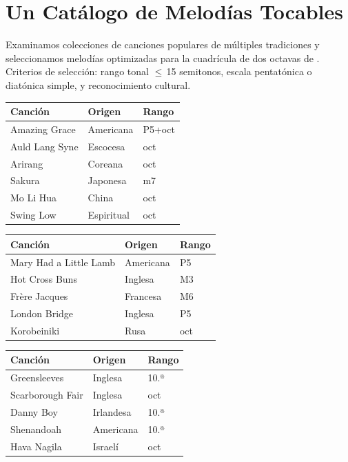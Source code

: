 \documentclass[11pt]{article}
\begin{document}
\section{Un Catálogo de Melodías Tocables}

Examinamos colecciones de canciones populares de múltiples tradiciones y seleccionamos melodías optimizadas para la cuadrícula de dos octavas de \np{}. Criterios de selección: rango tonal $\leq$\,15 semitonos, escala pentatónica o diatónica simple, y reconocimiento cultural.

\begin{card}
\begin{tabularx}{\linewidth}{Xll}
\toprule
\textbf{Canción} & \textbf{Origen} & \textbf{Rango} \\
\midrule
Amazing Grace & Americana & P5+oct \\
Auld Lang Syne & Escocesa & oct \\
Arirang & Coreana & oct \\
Sakura & Japonesa & m7 \\
Mo Li Hua & China & oct \\
Swing Low & Espiritual & oct \\
\bottomrule
\end{tabularx}
\end{card}

\begin{card}
\begin{tabularx}{\linewidth}{Xll}
\toprule
\textbf{Canción} & \textbf{Origen} & \textbf{Rango} \\
\midrule
Mary Had a Little Lamb & Americana & P5 \\
Hot Cross Buns & Inglesa & M3 \\
Fr\`ere Jacques & Francesa & M6 \\
London Bridge & Inglesa & P5 \\
Korobeiniki & Rusa & oct \\
\bottomrule
\end{tabularx}
\end{card}

\begin{card}
\begin{tabularx}{\linewidth}{Xll}
\toprule
\textbf{Canción} & \textbf{Origen} & \textbf{Rango} \\
\midrule
Greensleeves & Inglesa & 10.ª \\
Scarborough Fair & Inglesa & oct \\
Danny Boy & Irlandesa & 10.ª \\
Shenandoah & Americana & 10.ª \\
Hava Nagila & Israelí & oct \\
\bottomrule
\end{tabularx}
\end{card}
\end{document}
